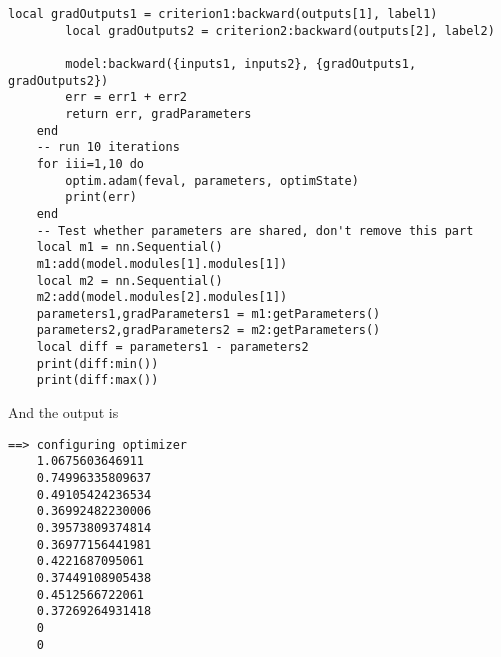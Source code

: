\documentclass[12pt]{article}
\begin{document}
\begin{lstlisting}[breaklines=true]
		local gradOutputs1 = criterion1:backward(outputs[1], label1)
		local gradOutputs2 = criterion2:backward(outputs[2], label2)
	
		model:backward({inputs1, inputs2}, {gradOutputs1, gradOutputs2})
		err = err1 + err2
		return err, gradParameters
	end
	-- run 10 iterations
	for iii=1,10 do
		optim.adam(feval, parameters, optimState)
		print(err)
	end
	-- Test whether parameters are shared, don't remove this part
	local m1 = nn.Sequential()
	m1:add(model.modules[1].modules[1])
	local m2 = nn.Sequential()
	m2:add(model.modules[2].modules[1])
	parameters1,gradParameters1 = m1:getParameters()
	parameters2,gradParameters2 = m2:getParameters()
	local diff = parameters1 - parameters2
	print(diff:min())
	print(diff:max())
	\end{lstlisting}
	And the output is
	\begin{lstlisting}[breaklines=true]
	==> configuring optimizer
	1.0675603646911	
	0.74996335809637	
	0.49105424236534	
	0.36992482230006	
	0.39573809374814	
	0.36977156441981	
	0.4221687095061	
	0.37449108905438	
	0.4512566722061	
	0.37269264931418	
	0	
	0
	\end{lstlisting}		
	
\end{document}
